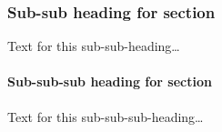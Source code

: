 \documentclass{bmcart}
\begin{document}
			\subsubsection*{Sub-sub heading for section}
				Text for this sub-sub-heading\ldots
					
					\paragraph*{Sub-sub-sub heading for section}
						Text for this sub-sub-sub-heading\ldots
	
	
	
	
	
	
	
	
	
	
	
\end{document}
